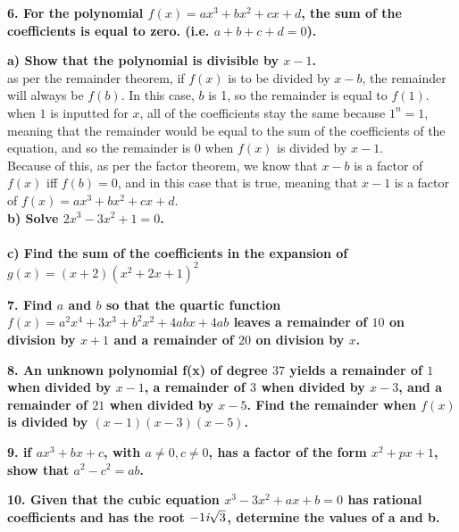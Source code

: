 \documentclass[14pt, a4paper]{extarticle}
\begin{document}
\textbf{6. For the polynomial $f(x) = ax^3 + bx^2 + cx + d$, 
the sum of the coefficients is equal to zero. 
(i.e. $a + b + c + d = 0$).}
\begin{adjustwidth}{1cm}{0pt}
    \textbf{a) Show that the polynomial is divisible by $x - 1$.} \\
    as per the remainder theorem, if $f(x)$ is to be divided by $x - b$, the remainder 
    will always be $f(b)$. In this case, $b$ is 1, so the remainder is equal to $f(1)$. \\
    when $1$ is inputted for $x$, all of the coefficients stay the same because $1^n = 1$, 
    meaning that the remainder would be equal to the sum of the coefficients
    of the equation, and so the remainder is 0 when $f(x)$ is divided by $x - 1$. \\
    Because of this, as per the factor theorem, we know that $x - b$ is a factor of $f(x)$ 
    iff $f(b) = 0$, and in this case that is true, meaning that $x - 1$ is a factor of 
    $f(x) = ax^3 + bx^2 + cx + d$.
    \\
    \textbf{b) Solve $2x^3 - 3x^2 + 1 = 0$.} \\
    \\
    \textbf{c) Find the sum of the coefficients in the expansion of $g(x) = (x + 2)(x^2 + 2x + 1)^2$} \\
\end{adjustwidth}

\textbf{7. Find $a$ and $b$ so that the quartic function $f(x) = a^2x^4 + 3x^3 + b^2x^2 + 4abx + 4ab$ 
leaves a remainder of $10$ on division by $x + 1$ and a remainder of $20$ on division by $x$.}
\begin{adjustwidth}{1cm}{0pt}
\end{adjustwidth}

\textbf{8. An unknown polynomial f(x) of degree $37$ yields a remainder of $1$ when divided by $x - 1$, 
a remainder of $3$ when divided by $x - 3$, and a remainder of $21$ when divided by $x - 5$. 
Find the remainder when $f(x)$ is divided by $(x - 1)(x - 3)(x - 5)$.}
\begin{adjustwidth}{1cm}{0pt}
\end{adjustwidth}

\textbf{9. if $ax^3 + bx + c$, with $a \neq 0, c \neq 0$, has a factor of the form $x^2 + px + 1$, 
show that $a^2 - c^2 = ab$.}
\begin{adjustwidth}{1cm}{0pt}
\end{adjustwidth}

\textbf{10. Given that the cubic equation $x^3 - 3x^2 + ax + b = 0$ has rational coefficients and has the root $-1\emph{i}\sqrt{3}$, 
determine the values of a and b.}
\begin{adjustwidth}{1cm}{0pt}
\end{adjustwidth}
\end{document}
